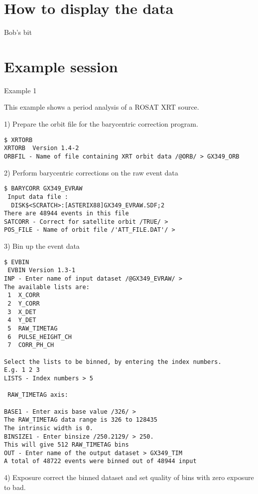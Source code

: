\section{How to display the data}
 Bob's bit


\section{Example session}

Example 1

This example shows a period analysis of a ROSAT XRT source.

1) Prepare the orbit file for the barycentric correction program.

\begin{verbatim}
$ XRTORB                         
XRTORB  Version 1.4-2
ORBFIL - Name of file containing XRT orbit data /@ORB/ > GX349_ORB
\end{verbatim}

2) Perform barycentric corrections on the raw event data

\begin{verbatim}
$ BARYCORR GX349_EVRAW
 Input data file :
  DISK$<SCRATCH>:[ASTERIX88]GX349_EVRAW.SDF;2
There are 48944 events in this file
SATCORR - Correct for satellite orbit /TRUE/ > 
POS_FILE - Name of orbit file /'ATT_FILE.DAT'/ > 
\end{verbatim}

3) Bin up the event data

\begin{verbatim}
$ EVBIN
 EVBIN Version 1.3-1
INP - Enter name of input dataset /@GX349_EVRAW/ > 
The available lists are:
 1  X_CORR         
 2  Y_CORR         
 3  X_DET          
 4  Y_DET          
 5  RAW_TIMETAG    
 6  PULSE_HEIGHT_CH
 7  CORR_PH_CH     

Select the lists to be binned, by entering the index numbers.
E.g. 1 2 3
LISTS - Index numbers > 5

 RAW_TIMETAG axis:

BASE1 - Enter axis base value /326/ > 
The RAW_TIMETAG data range is 326 to 128435
The intrinsic width is 0.
BINSIZE1 - Enter binsize /250.2129/ > 250.
This will give 512 RAW_TIMETAG bins
OUT - Enter name of the output dataset > GX349_TIM
A total of 48722 events were binned out of 48944 input
\end{verbatim}

4) Exposure correct the binned dataset and set quality of bins
   with zero exposure to bad.


